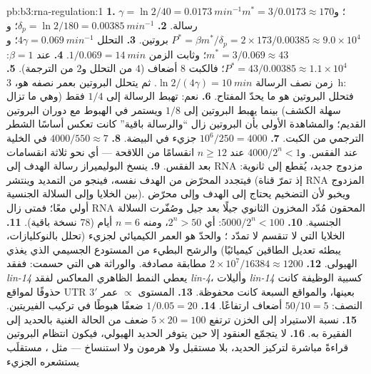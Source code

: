 \begin{solution}{pb:b3:rna-regulation:1}
\textbf{1.} $\gamma = \ln 2/40 = \qty{0.0173}{min^{-1}}$؛ و$m^{*} =
3/0.0173 \approx 170$ رسالة.
\textbf{2.} $\delta_{p} = \ln 2/180 = \qty{0.00385}{min^{-1}}$؛ و$P^{*} =
\beta m^{*}/\delta_{p} = 2\times 173/0.00385 \approx 9.0\times 10^{4}$
بروتين.
\textbf{3.} التحلل $4\gamma = \qty{0.069}{min^{-1}}$؛ و$m^{*} = 3/0.069
\approx 43$؛ وثابت الزمن $1/0.069 = \qty{14}{min}$.
\textbf{4.} عند $\beta = 1$: $P^{*} = 43/0.00385 \approx 1.1\times 10^{4}$؛
فالكبت $8$ أضعاف ($4$ من التحلل و$2$ من الترجمة).
\textbf{5.} زمن نصف الرسالة $\ln 2/(4\gamma) = \qty{10}{min}$. ثم
يتحلل البروتين بعمر نصفه هو، \qty{3}{h}: فتحلل البروتين هو ما يحدّ
المفتاح.
\textbf{6.} نعم: تهبط الرسالة إلى $1/4$ فقط (وهي ما تزال سهلة
الكشف) بينما يهبط البروتين إلى $1/8$ ويستمر في الهبوط مع دوران
البروتين القديم؛ والمشاهدة الأولى بأن البروتين زال ``والرسالة
باقية'' كانت تعكس أساسًا الشطر الترجمي من الكبت.
\textbf{7.} $10^{6}/250 = 4000$ جزيء في البيضة.
\textbf{8.} $4000/550 \approx 7$ في الخلية عند الفقس. و$4000/2^{n} < 1$
عند $n \ge 12$ انقسامًا من اللاقحة --- أي نحو ثلاثة انقسامات
بعد الفقس.
\textbf{9.} ينسخ البوليميراز رسالة الهدف إلى RNA مزدوج جديد، يُقطع
إلى  ثانوية: فيتجدد المحرّض من الهدف نفسه، فينجو من التمديد
وينتشر (إذ تمرّ قناة RNA المزدوج بين الخلايا وإلى السلالة
الجنسية). ويخبو لأن التضخيم يحتاج إلى الهدف وإلى محرّض أولي معًا؛
فمتى زال RNA المحقون مُدّد المخزون الثانوي جيلًا بعد جيل وصُفّرت
السلالة الجنسية.
\textbf{10.} $5000/2^{n} < 100$: أي $2^{n} > 50$، ومنه $n = 6$ أيام ($78$
نسخة باقية).
\textbf{11.} الخلايا التي لا تنقسم لا تمدّد ؛ والحدّ هو العمر
الكيميائي لجزيء  (تحلل بالنوكليازات، يبطئه تعديل الطاقين
كيميائيًا) والرشح البطيء من المستودع الجسيمي الذي يغذي الهيولى.
\textbf{12.} $2\times 10^{7}/\num{16384} \approx \num{1200}$ مطابقة
مصادفة. والوراثة هي التي حسمت: ففقد \emph{lin-14} يعطي النمط
الظاهري المعاكس لفقد \emph{lin-4}، وأليلات \emph{lin-14} كسبية
الوظيفة كانت حذوفًا لمواقع UTR 3$'$ بعينها، والمواقع السبعة كانت
محفوظة.
\textbf{13.} المستوى $\propto$ عمر النصف: $50/10 = 5$ أضعاف ارتفاعًا.
\textbf{14.} $1/0.05 = 20$ ضعفًا هبوطًا في تركيب الفيريتين.
\textbf{15.} نسبة الاستيراد إلى الخزن ترتفع $5\times 20 = 100$ ضعف من
الحالة الغنية بالحديد إلى الفقيرة به.
\textbf{16.} لا يتجمّع العنقود إلا حين يتوفر الحديد الهيولي،
فيكون انتظام البروتين قراءةً مباشرة لتركيز الحديد، بلا مستقبل ولا
هرمون ولا استنساخ --- مثل ، مستقلَب يستشعره الجزيء

\end{solution}
